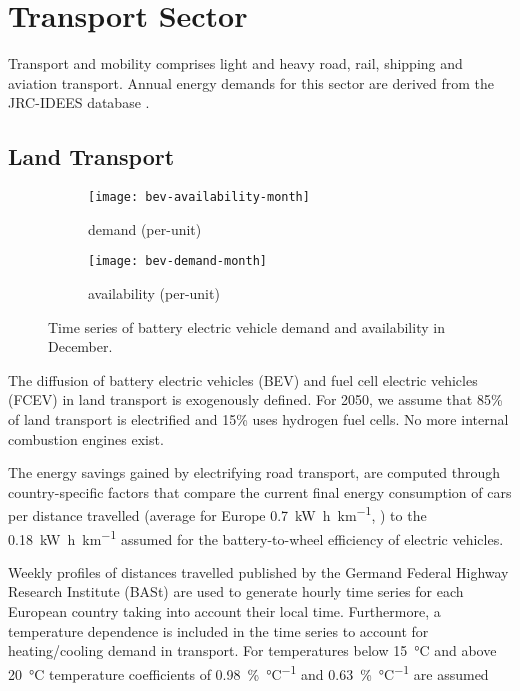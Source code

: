 \section{Transport Sector}
\label{sec:si:transport}

Transport and mobility comprises light and heavy road, rail, shipping and
aviation transport. Annual energy demands for this sector are derived from the
JRC-IDEES database .

\subsection{Land Transport}
\label{sec:si:transport:land}

\begin{figure}
    \centering
    \begin{subfigure}[t]{\textwidth}
        \centering
        \caption{demand (per-unit)}
        \texttt{[image: bev-availability-month]}
    \end{subfigure}
    \vspace{-0.5cm}
    \begin{subfigure}[t]{\textwidth}
        \centering
        \caption{availability (per-unit)}
        \texttt{[image: bev-demand-month]}
    \end{subfigure}
    \caption{Time series of battery electric vehicle demand and availability in December.}
    \label{fig:bev-demand-availability}
\end{figure}

The diffusion of battery electric vehicles (BEV) and fuel cell electric vehicles
(FCEV) in land transport is exogenously defined. For 2050, we assume that 85\%
of land transport is electrified and 15\% uses hydrogen fuel cells. No more
internal combustion engines exist.

The energy savings gained by electrifying road transport, are computed through
country-specific factors that compare the current final energy consumption of
cars per distance travelled (average for Europe
\SI{0.7}{\kilo\watt\hour\per\kilo\metre}, \citeS{}) to the
\SI{0.18}{\kilo\watt\hour\per\kilo\metre} assumed for the battery-to-wheel
efficiency of electric vehicles.

Weekly profiles of distances travelled published by the Germand Federal Highway
Research Institute (BASt) \citeS{} are used to generate hourly time series for
each European country taking into account their local time. Furthermore, a
temperature dependence is included in the time series to account for
heating/cooling demand in transport. For temperatures below \SI{15}{\celsius}
and above \SI{20}{\celsius} temperature coefficients of
\SI{0.98}{\percent\per\celsius} and \SI{0.63}{\percent\per\celsius} are assumed


